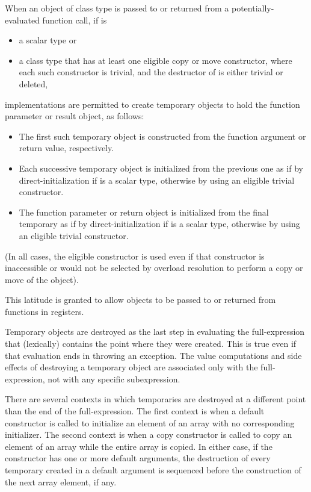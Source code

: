 \pnum
When an object of class type 
is passed to or returned from a potentially-evaluated function call,
if  is
\begin{itemize}
\item
a scalar type or
\item
a class type that
has at least one eligible copy or move constructor,
where each such constructor is trivial,
and the destructor of  is either trivial or deleted,
\end{itemize}
implementations are permitted
to create temporary objects
to hold the function parameter or result object,
as follows:
\begin{itemize}
\item
The first such temporary object
is constructed from the function argument or return value, respectively.
\item
Each successive temporary object
is initialized from the previous one
as if by direct-initialization if  is a scalar type,
otherwise by using an eligible trivial constructor.
\item
The function parameter or return object is initialized
from the final temporary
as if by direct-initialization if  is a scalar type,
otherwise by using an eligible trivial constructor.
\end{itemize}
(In all cases, the eligible constructor is used
even if that constructor is inaccessible
or would not be selected by overload resolution
to perform a copy or move of the object).
\begin{note}
This latitude is granted to allow objects
to be passed to or returned from functions in registers.
\end{note}

\pnum
{}%
%
%
Temporary objects are destroyed as the last step
in evaluating
the full-expression
that (lexically) contains the point where
they were created.
This is true even if that evaluation ends in throwing an exception.
The
%
value computations and
%
side effects of destroying a temporary object
are associated only with the full-expression, not with any specific
subexpression.

\pnum
{}%
%
There are several contexts in which temporaries are destroyed at a different
point than the end of the full-expression.
The first context is when a default constructor is called to initialize
an element of an array with no corresponding initializer.
The second context is when a copy constructor is called to copy an element of
an array while the entire array is copied.
In either case, if the constructor has one or more default arguments,
the destruction of every temporary created in a default argument is
sequenced before the construction of the next array element, if any.

